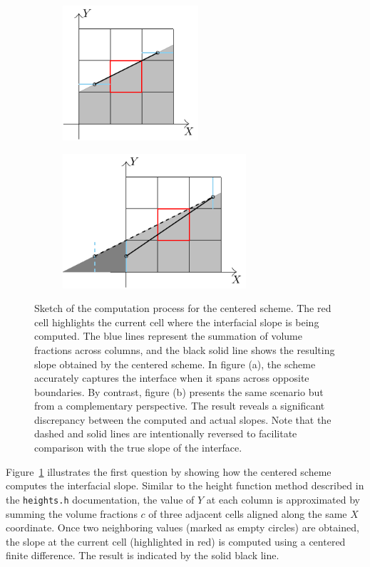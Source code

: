 \begin{figure}[ht]
    \centering
    \begin{subfigure}[t]{0.45\textwidth}
        \centering
        \includegraphics[height=5cm]{./image/myc-h-and-myc2d-h/centered-a.pdf}
        \subcaption{}
        \label{fig:myc-centered-a}
    \end{subfigure}
    \begin{subfigure}[t]{0.45\textwidth}
        \centering
        \includegraphics[height=5cm]{./image/myc-h-and-myc2d-h/centered-b.pdf}
        \subcaption{}
        \label{fig:myc-centered-b}
    \end{subfigure}
    \caption{Sketch of the computation process for the centered scheme. The red cell highlights the current cell where the interfacial slope is being computed. The blue lines represent the summation of volume fractions across columns, and the black solid line shows the resulting slope obtained by the centered scheme. In figure (a), the scheme accurately captures the interface when it spans across opposite boundaries. By contrast, figure (b) presents the same scenario but from a complementary perspective. The result reveals a significant discrepancy between the computed and actual slopes. Note that the dashed and solid lines are intentionally reversed to facilitate comparison with the true slope of the interface.}
    \label{fig:myc-centered}
\end{figure}

Figure~\ref{fig:myc-centered-a} illustrates the first question by showing how the centered scheme computes the interfacial slope. Similar to the height function method described in the \texttt{heights.h} documentation, the value of $Y$ at each column is approximated by summing the volume fractions $c$ of three adjacent cells aligned along the same $X$ coordinate. Once two neighboring values (marked as empty circles) are obtained, the slope at the current cell (highlighted in red) is computed using a centered finite difference. The result is indicated by the solid black line.


